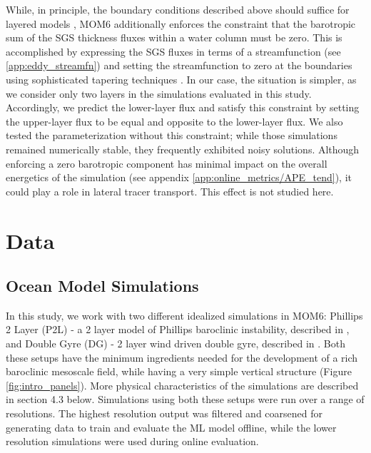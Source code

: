 \documentclass[draft]{agujournal2019}
\begin{document}
While, in principle, the boundary conditions described above should suffice for layered models \cite{killworth2001boundary}, MOM6 additionally enforces the constraint that the barotropic sum of the SGS thickness fluxes within a water column must be zero. This is accomplished by expressing the SGS fluxes in terms of a streamfunction (see \ref{app:eddy_streamfn}) and setting the streamfunction to zero at the boundaries using sophisticated tapering techniques \cite{ferrari2008parameterization, ferrari2010boundary}. In our case, the situation is simpler, as we consider only two layers in the simulations evaluated in this study. Accordingly, we predict the lower-layer flux and satisfy this constraint by setting the upper-layer flux to be equal and opposite to the lower-layer flux. We also tested the parameterization without this constraint; while those simulations remained numerically stable, they frequently exhibited noisy solutions.
Although enforcing a zero barotropic component has minimal impact on the overall energetics of the simulation (see appendix \ref{app:online_metrics/APE_tend}), it could play a role in  lateral tracer transport. This effect is not studied here.


\section{Data}
\subsection{Ocean Model Simulations} 
In this study, we work with two different idealized simulations in MOM6: Phillips 2 Layer (P2L) - a 2 layer model of Phillips baroclinic instability, described in , and Double Gyre (DG) - 2 layer wind driven double gyre, described in . 
Both these setups have the minimum ingredients needed for the development of a rich baroclinic mesoscale field, while having a very simple vertical structure (Figure \ref{fig:intro_panels}). More physical characteristics of the simulations are described in section 4.3 below. Simulations using both these setups were run over a range of resolutions. The highest resolution output was filtered and coarsened for generating data to train and evaluate the ML model offline, while the lower resolution simulations were used during online evaluation.
\end{document}
